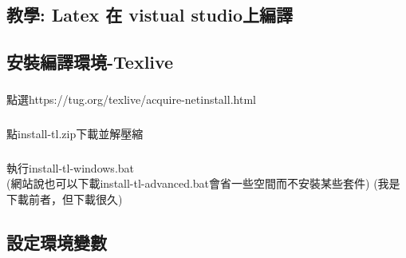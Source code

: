 \documentclass[12pt]{article}
\begin{document}
\begin{CJK*}{UTF8}{bsmi}

    \section{教學: Latex 在 vistual studio上編譯}

    \subsection{安裝編譯環境-Texlive}
    \subsubsection{}
    點選https://tug.org/texlive/acquire-netinstall.html
    \subsubsection{}
    點install-tl.zip下載並解壓縮
    \subsubsection{}
    執行install-tl-windows.bat\\
    (網站說也可以下載install-tl-advanced.bat會省一些空間而不安裝某些套件)
    (我是下載前者，但下載很久)
    \newpage
    \subsection{設定環境變數}

\end{CJK*}
\end{document}
